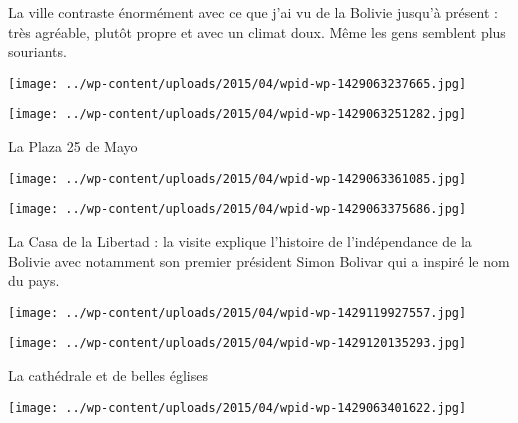  La ville contraste énormément avec ce que j'ai vu de la Bolivie jusqu'à présent : très agréable, plutôt propre et avec un climat doux. Même les gens semblent plus souriants. 

 

\begin{center} \texttt{[image: ../wp-content/uploads/2015/04/wpid-wp-1429063237665.jpg]} \end{center}



 

\begin{center} \texttt{[image: ../wp-content/uploads/2015/04/wpid-wp-1429063251282.jpg]} \end{center}



 La Plaza 25 de Mayo

 

\begin{center} \texttt{[image: ../wp-content/uploads/2015/04/wpid-wp-1429063361085.jpg]} \end{center}



 

\begin{center} \texttt{[image: ../wp-content/uploads/2015/04/wpid-wp-1429063375686.jpg]} \end{center}



 La Casa de la Libertad : la visite explique l'histoire de l'indépendance de la Bolivie avec notamment son premier président Simon Bolivar qui a inspiré le nom du pays. 

 

\begin{center} \texttt{[image: ../wp-content/uploads/2015/04/wpid-wp-1429119927557.jpg]} \end{center}



 

\begin{center} \texttt{[image: ../wp-content/uploads/2015/04/wpid-wp-1429120135293.jpg]} \end{center}



 La cathédrale et de belles églises

 

\begin{center} \texttt{[image: ../wp-content/uploads/2015/04/wpid-wp-1429063401622.jpg]} \end{center}



